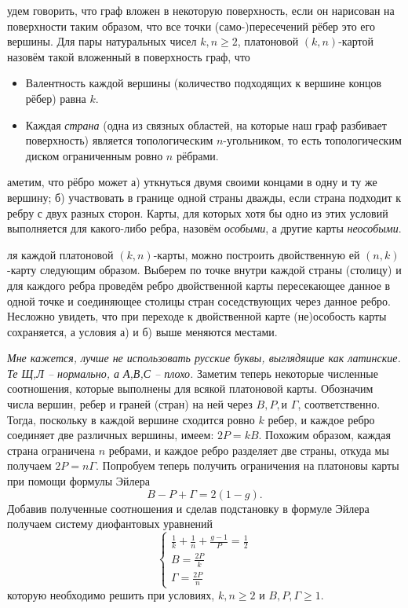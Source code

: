 \documentclass[12pt, a4paper, openany]{amsart}
\theoremstyle{plain}
\theoremstyle{definition}
\theoremstyle{remark}
\newcommand{\slava}[1]{{\color{blue}#1}}
\newcommand{\slavacom}[1]{{\color{blue}\it#1}}
\def\slavapar#1\par{\slava{#1}\par}
\begin{document}
\slavapar
Будем говорить, что граф вложен в некоторую поверхность, если он
нарисован на поверхности таким образом, что все точки
(само-)пересечений рёбер это его вершины. Для пары натуральных чисел
$k,n\geq2$, платоновой $(k,n)$-картой назовём такой
вложенный в поверхность граф, что
\begin{itemize}
\item Валентность каждой вершины (количество подходящих к вершине
  концов рёбер) равна $k$.
\item Каждая \textit{страна} (одна из связных областей, на которые наш
  граф разбивает поверхность) является топологическим
  $n$-угольником, то есть топологическим диском ограниченным ровно $n$
  рёбрами.  
\end{itemize} 

\slavapar
Заметим, что рёбро может а) уткнуться двумя своими концами в одну и ту
же вершину; б) участвовать в границе одной страны дважды, если страна
подходит к ребру с двух разных сторон.  Карты, для которых хотя бы одно
из этих условий выполняется для какого-либо ребра, назовём \textit{особыми}, а
другие карты \textit{неособыми}.

\slavapar
Для каждой платоновой $(k,n)$-карты, можно построить двойственную ей
$(n,k)$-карту следующим образом. Выберем по точке внутри каждой страны
(столицу) и для каждого ребра проведём ребро двойственной карты
пересекающее данное в одной точке и соединяющее столицы стран
соседствующих через данное ребро. Несложно увидеть, что при переходе к
двойственной карте (не)особость карты сохраняется, а условия а) и б)
выше меняются местами.



\slavacom{Мне кажется, лучше не использовать русские буквы, выглядящие
как латинские. Те Щ,Л -- нормально, а А,В,С -- плохо.}	
Заметим теперь некоторые численные соотношения, которые выполнены для
всякой платоновой карты. Обозначим числа вершин, ребер и граней
(стран) на ней через $B,P, и $ $\Gamma$, соответственно.  Тогда,
поскольку в каждой вершине сходится ровно $k$ ребер, и каждое ребро
соединяет две различных вершины, имеем: $2P=kB$. Похожим образом,
каждая страна ограничена $n$ ребрами, и каждое ребро разделяет две
страны, откуда мы получаем $2P=n\Gamma$. Попробуем теперь
получить ограничения на платоновы карты при помощи формулы Эйлера
$$
B-P+\Gamma=2(1-g).
$$
Добавив полученные соотношения и сделав подстановку в формуле Эйлера
получаем систему диофантовых уравнений
\begin{equation}\label{eq:eiler}
  \begin{cases}
    \frac{1}{k}+\frac{1}{n}+\frac{g-1}{P}=\frac{1}{2}\\
    B=\frac{2P}{k}\\
    \Gamma=\frac{2P}{n}
  \end{cases}
\end{equation}
которую необходимо решить при условиях, $k,n\geq2$ и $B,P,\Gamma\geq1$.
\end{document}
